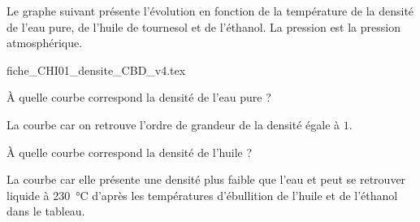 Le graphe suivant présente l'évolution en fonction de la température de la densité de l'eau pure, de l'huile de tournesol et de l'éthanol. La pression est la pression atmosphérique.
\vspace{-1.5mm}

\begin{center}
{fiche_CHI01_densite_CBD_v4.tex}
\end{center}

\vspace{-4mm}

\debutEntrainement





\begin{enonce}
À quelle courbe correspond la densité de l'eau pure ?
\end{enonce}


\begin{corrige}
La courbe  car on retrouve l'ordre de grandeur de la densité égale à $1$.
\end{corrige}





\begin{enonce}
À quelle courbe correspond la densité de l'huile ?	
\end{enonce}


\begin{corrige}
La courbe  car elle présente une densité plus faible que l'eau et peut se retrouver liquide à \SI{230}{\celsius} d'après les températures d'ébullition de l'huile et de l'éthanol dans le tableau.
\end{corrige}





